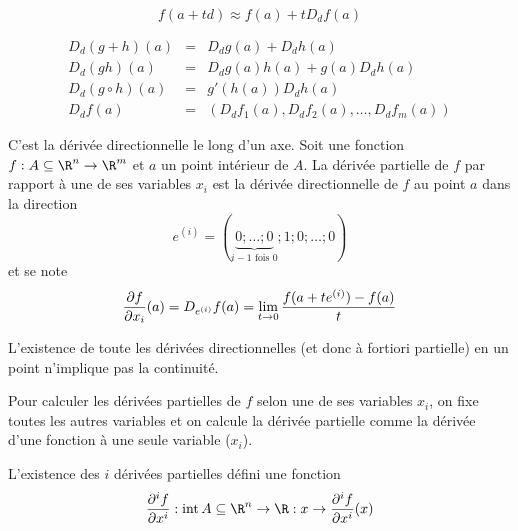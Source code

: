 \begin{myform}
	\[ f(a+td) \approx f(a) + t D_df(a) \]
\end{myform}

\begin{myform}
	\begin{eqnarray*}
		D_d(g+h)(a) &=& D_dg(a) + D_d h(a)\\
		D_d(gh)(a) &=& D_dg(a)h(a) + g(a)D_dh(a)\\
		D_d(g\circ h)(a) &=& g'(h(a))D_dh(a)\\
		D_df(a) &=& (D_df_1(a), D_df_2(a), \dots, D_df_m(a))
	\end{eqnarray*}
\end{myform}

\begin{mydef}
	C'est la dérivée directionnelle le long d'un axe.
	Soit une fonction $f : A\subseteq \R^n \to \R^m$ et $a$ un point intérieur de $A$. La dérivée partielle de $f$ par rapport à une de ses variables $x_i$ est la dérivée directionnelle de $f$ au point $a$ dans la direction
	\[ e^{(i)} = (\underbrace{0; \dots; 0}_{i-1\text{ fois }0}; 1; 0; \dots; 0) \]
	et se note
	\[ \frac{\partial f}{\partial x_i}(a) = D_{e^{(i)}} f(a) = \lim_{t \to 0} \frac{f(a+te^{(i)})
	- f(a)}{t}\]
\end{mydef}

\begin{myrem}
	L'existence de toute les dérivées directionnelles (et donc à fortiori partielle) en un point n'implique pas la continuité.
\end{myrem}

\begin{myform} Pour calculer les dérivées partielles de $f$ selon une de ses variables $x_i$, on fixe toutes les autres variables et on calcule la dérivée partielle comme la dérivée d'une fonction à une seule variable ($x_i$).
\end{myform}

\begin{mydef}
	L'existence des $i$\ieme{} dérivées partielles défini une fonction
	\[ \frac{\pa^i f}{\pa x^i} : \newint A \subseteq \R^n \to \R : x \to \frac{\pa^i f}{\pa x^i}(x) \]
\end{mydef}


